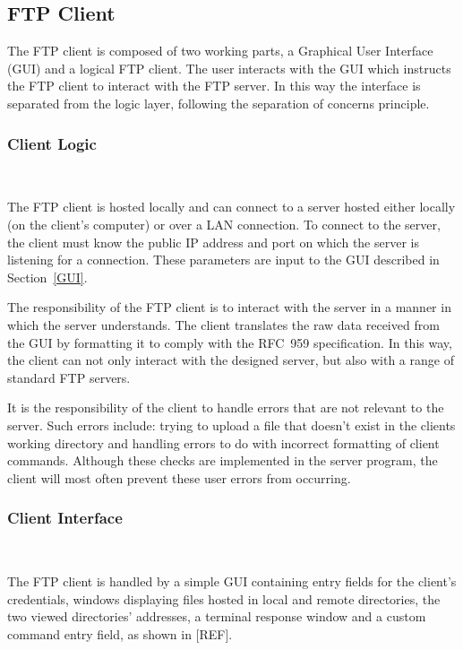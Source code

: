 \documentclass[10pt,twocolumn]{witseiepaper}
\begin{document}
\subsection{FTP Client}

The FTP client is composed of two working parts, a Graphical User Interface (GUI) and a logical FTP client. The user interacts with the GUI which instructs the FTP client to interact with the FTP server. In this way the interface is separated from the logic layer, following the separation of concerns principle.

\vspace*{-2mm}
\subsubsection{Client Logic} $     $

The FTP client is hosted locally and can connect to a server hosted either locally (on the client's computer) or over a LAN connection. To connect to the server, the client must know the public IP address and port on which the server is listening for a connection. These parameters are input to the GUI described in Section~\ref{GUI}.

The responsibility of the FTP client is to interact with the server in a manner in which the server understands. The client translates the raw data received from the GUI by formatting it to comply with the RFC~959 specification. In this way, the client can not only interact with the designed server, but also  with a range of standard FTP servers.

It is the responsibility of the client to handle errors that are not relevant to the server. Such errors include: trying to upload a file that doesn't exist in the clients working directory and handling errors to do with incorrect formatting of client commands. Although these checks are implemented in the server program, the client will most often prevent these user errors from occurring.

\vspace*{-2mm}
\subsubsection{Client Interface} $      $

The FTP client is handled by a simple GUI containing entry fields for the client's credentials, windows displaying files hosted in local and remote directories, the two viewed directories' addresses, a terminal response window and a custom command entry field, as shown in [REF]. 
\end{document}
